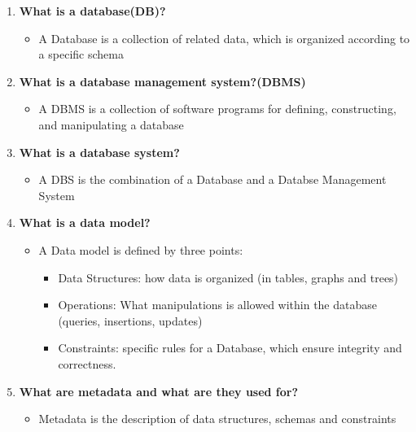 \documentclass[10pt,a4paper]{article}
\begin{document}
\begin{enumerate}
	\item \textbf{What is a database(DB)?}
	
	\begin{itemize}
		\item A Database is a collection of related data, which is organized according to a specific schema
	\end{itemize}
	
	\item \textbf{What is a database management system?(DBMS)}
	\begin{itemize}
		\item A DBMS is a collection of software programs for defining, constructing, and manipulating a database
	\end{itemize}
	
	\item \textbf{What is a database system?}
	\begin{itemize}
		\item A DBS is the combination of a Database and a Databse Management System
	\end{itemize}
	
	\item \textbf{What is a data model?}
	\begin{itemize}
		\item A Data model is defined by three points:
		\begin{itemize}
			\item Data Structures: how data is organized (in tables, graphs and trees)
			\item Operations: What manipulations is allowed within the database (queries, insertions, updates)
			\item Constraints: specific rules for a Database, which ensure integrity and correctness.
		\end{itemize}
	\end{itemize}
	
	\item \textbf{What are metadata and what are they used for?}
	\begin{itemize}
		\item Metadata is the description of data structures, schemas and constraints
	\end{itemize}
\end{enumerate}

\end{document}
